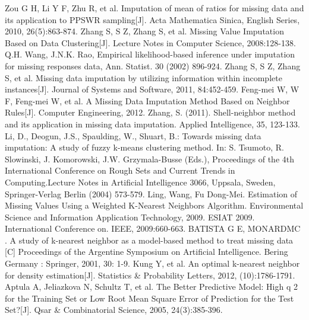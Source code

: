 \documentclass[print]{jicspack}
\begin{document}
\begin{thebibliography}{00}
 Zou G H, Li Y F, Zhu R, et al. Imputation of mean of ratios for missing data and its application to PPSWR sampling[J]. Acta Mathematica Sinica, English Series, 2010, 26(5):863-874.
 Zhang S, S Z, Zhang S, et al. Missing Value Imputation Based on Data Clustering[J]. Lecture Notes in Computer Science, 2008:128-138.
 Q.H. Wang, J.N.K. Rao, Empirical likelihood-based inference under imputation for missing responses data, Ann. Statist. 30 (2002) 896-924.
 Zhang S, S Z, Zhang S, et al. Missing data imputation by utilizing information within incomplete instances[J]. Journal of Systems and Software, 2011, 84:452-459.
 Feng-mei W, W F, Feng-mei W, et al. A Missing Data Imputation Method Based on Neighbor Rules[J]. Computer Engineering, 2012.
 Zhang, S. (2011). Shell-neighbor method and its application in missing data imputation. Applied Intelligence, 35, 123-133.
 Li, D., Deogun, J.S., Spaulding, W., Shuart, B.: Towards missing data imputation: A study of fuzzy k-means clustering method. In: S. Tsumoto, R. Slowinski, J. Komorowski, J.W. Grzymala-Busse (Eds.), Proceedings of the 4th International Conference on Rough Sets and Current Trends in Computing.Lecture Notes in Artificial Intelligence 3066, Uppsala, Sweden, Springer-Verlag Berlin (2004) 573-579.
 Ling, Wang, Fu Dong-Mei. Estimation of Missing Values Using a Weighted K-Nearest Neighbors Algorithm. Environmental Science and Information Application Technology, 2009. ESIAT 2009. International Conference on. IEEE, 2009:660-663.
 BATISTA G E, MONARDMC . A study of k-nearest neighbor as a model-based method to treat missing data [C] Proceedings of the Argentine Symposium on Artificial Intelligence. Bering Germany : Springer, 2001, 30: 1-9.
 Kung Y, et al. An optimal k-nearest neighbor for density estimation[J]. Statistics \& Probability Letters, 2012, (10):1786-1791.
 Aptula A, Jeliazkova N, Schultz T, et al. The Better Predictive Model: High q 2 for the Training Set or Low Root Mean Square Error of Prediction for the Test Set?[J]. Qsar \& Combinatorial Science, 2005, 24(3):385-396.
\end{thebibliography}
\end{document}
